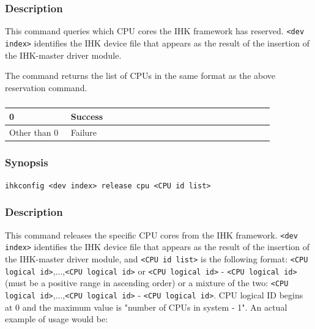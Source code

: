\documentclass[twoside,11pt,fleqn]{book}
\begin{document}
\subsubsection*{Description}{\quad}
This command queries which CPU cores the IHK framework has reserved.
\texttt{<dev index>} identifies
the IHK device file that appears as the result of the insertion of the
IHK-master driver module.

The command returns the list of CPUs in the same format as the above
reservation command.

\subsubsection*{}
\begin{table}[!h]
\footnotesize
\begin{tabular}{|p{0.20\linewidth}|p{0.66\linewidth}|} \hline
0&Success\\ \hline
Other than 0&Failure\\ \hline
\end{tabular}
\vspace{-0em}
\end{table}
\FloatBarrier

\subsubsection{}
\subsubsection*{Synopsis}{\quad} \texttt{ihkconfig <dev index> release cpu <CPU id list>}
\subsubsection*{Description}{\quad}
This command releases the specific CPU cores from the IHK framework.
\texttt{<dev index>} identifies
the IHK device file that appears as the result of the insertion of the
IHK-master driver module,
and \texttt{<CPU id list>} is the following format:
\texttt{<CPU logical id>},...,\texttt{<CPU logical id>} or
\texttt{<CPU logical id>} - \texttt{<CPU logical id>}
(must be a positive range in ascending order)
or a mixture of the two: \texttt{<CPU logical id>},...,\texttt{<CPU logical
id>} - \texttt{<CPU logical id>}.
CPU logical ID begins at 0 and the maximum value is "number of CPUs in system - 1".
An actual example of usage would be:
\end{document}

